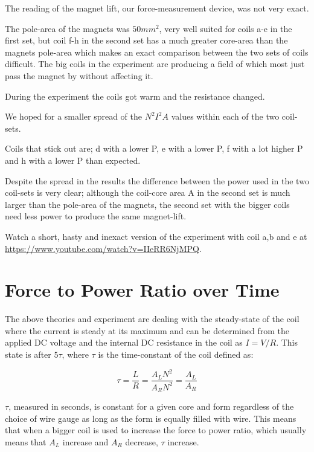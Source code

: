 \documentclass[]{../common/elementary-physics}
\begin{document}
The reading of the magnet lift, our force-measurement device, was not very exact.

The pole-area of the magnets was $50 mm^2$, very well suited for coils a-e in the first set, but coil f-h in the second set has a much greater core-area than the magnets pole-area which makes an exact comparison between the two sets of coils difficult. 
The big coils in the experiment are producing a field of which most just pass the magnet by without affecting it.

During the experiment the coils got warm and the resistance changed.

We hoped for a smaller spread of the $N^2 I^2 A$ values within each of the two coil-sets.

Coils that stick out are; d with a lower P, e with a lower P, f with a lot higher P and h with a lower P than expected.

Despite the spread in the results the difference between the power used in the two coil-sets is very clear; although the coil-core area A in the second set is much larger than the pole-area of the magnets, the second set with the bigger coils need less power to produce the same magnet-lift.

Watch a short, hasty and inexact version of the experiment with coil a,b and e at \url{https://www.youtube.com/watch?v=IIeRR6NjMPQ}.

\section{Force to Power Ratio over Time}

The above theories and experiment are dealing with the steady-state of the coil where the current is steady at its maximum and can be determined from the applied DC voltage and the internal DC resistance in the coil as $I = V/R$. 
This state is after $5 \tau$, where $\tau$ is the time-constant of the coil defined as:

\begin{equation}
\tau = \frac{L}{R} = \frac{A_L N^2}{A_R N^2} = \frac{A_L}{A_R}
\end{equation}

$\tau$, measured in seconds, is constant for a given core and form regardless of the choice of wire gauge as long as the form is equally filled with wire.
This means that when a bigger coil is used to increase the force to power ratio, which usually means that $A_L$ increase and $A_R$ decrease, $\tau$ increase.
\end{document}
